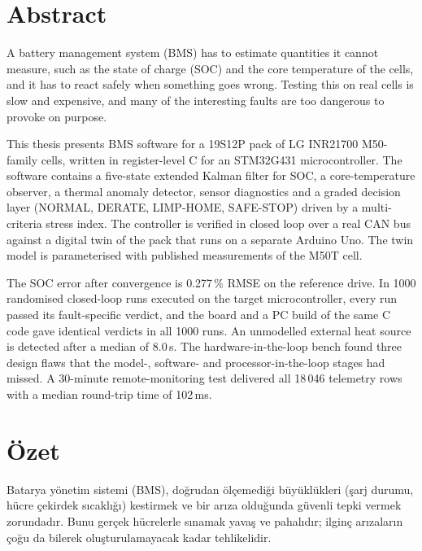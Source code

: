\chapter*{Abstract}

A battery management system (BMS) has to estimate quantities it cannot measure, such as the state of charge (SOC) and the core temperature of the cells, and it has to react safely when something goes wrong. Testing this on real cells is slow and expensive, and many of the interesting faults are too dangerous to provoke on purpose.

This thesis presents BMS software for a 19S12P pack of LG INR21700 M50-family cells, written in register-level C for an STM32G431 microcontroller. The software contains a five-state extended Kalman filter for SOC, a core-temperature observer, a thermal anomaly detector, sensor diagnostics and a graded decision layer (NORMAL, DERATE, LIMP-HOME, SAFE-STOP) driven by a multi-criteria stress index. The controller is verified in closed loop over a real CAN bus against a digital twin of the pack that runs on a separate Arduino Uno. The twin model is parameterised with published measurements of the M50T cell.

The SOC error after convergence is 0.277\,\% RMSE on the reference drive. In 1000 randomised closed-loop runs executed on the target microcontroller, every run passed its fault-specific verdict, and the board and a PC build of the same C code gave identical verdicts in all 1000 runs. An unmodelled external heat source is detected after a median of 8.0\,s. The hardware-in-the-loop bench found three design flaws that the model-, software- and processor-in-the-loop stages had missed. A 30-minute remote-monitoring test delivered all 18\,046 telemetry rows with a median round-trip time of 102\,ms.

\chapter*{Özet}


Batarya yönetim sistemi (BMS), doğrudan ölçemediği büyüklükleri (şarj durumu, hücre çekirdek sıcaklığı) kestirmek ve bir arıza olduğunda güvenli tepki vermek zorundadır. Bunu gerçek hücrelerle sınamak yavaş ve pahalıdır; ilginç arızaların çoğu da bilerek oluşturulamayacak kadar tehlikelidir.

